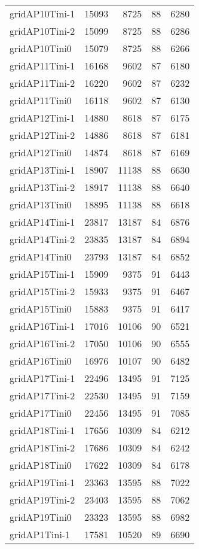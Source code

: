 \begin{longtable}{lrrrr}
gridAP10Tini-1 & 15093 & 8725 & 88 & 6280 \\
gridAP10Tini-2 & 15099 & 8725 & 88 & 6286 \\
gridAP10Tini0 & 15079 & 8725 & 88 & 6266 \\
gridAP11Tini-1 & 16168 & 9602 & 87 & 6180 \\
gridAP11Tini-2 & 16220 & 9602 & 87 & 6232 \\
gridAP11Tini0 & 16118 & 9602 & 87 & 6130 \\
gridAP12Tini-1 & 14880 & 8618 & 87 & 6175 \\
gridAP12Tini-2 & 14886 & 8618 & 87 & 6181 \\
gridAP12Tini0 & 14874 & 8618 & 87 & 6169 \\
gridAP13Tini-1 & 18907 & 11138 & 88 & 6630 \\
gridAP13Tini-2 & 18917 & 11138 & 88 & 6640 \\
gridAP13Tini0 & 18895 & 11138 & 88 & 6618 \\
gridAP14Tini-1 & 23817 & 13187 & 84 & 6876 \\
gridAP14Tini-2 & 23835 & 13187 & 84 & 6894 \\
gridAP14Tini0 & 23793 & 13187 & 84 & 6852 \\
gridAP15Tini-1 & 15909 & 9375 & 91 & 6443 \\
gridAP15Tini-2 & 15933 & 9375 & 91 & 6467 \\
gridAP15Tini0 & 15883 & 9375 & 91 & 6417 \\
gridAP16Tini-1 & 17016 & 10106 & 90 & 6521 \\
gridAP16Tini-2 & 17050 & 10106 & 90 & 6555 \\
gridAP16Tini0 & 16976 & 10107 & 90 & 6482 \\
gridAP17Tini-1 & 22496 & 13495 & 91 & 7125 \\
gridAP17Tini-2 & 22530 & 13495 & 91 & 7159 \\
gridAP17Tini0 & 22456 & 13495 & 91 & 7085 \\
gridAP18Tini-1 & 17656 & 10309 & 84 & 6212 \\
gridAP18Tini-2 & 17686 & 10309 & 84 & 6242 \\
gridAP18Tini0 & 17622 & 10309 & 84 & 6178 \\
gridAP19Tini-1 & 23363 & 13595 & 88 & 7022 \\
gridAP19Tini-2 & 23403 & 13595 & 88 & 7062 \\
gridAP19Tini0 & 23323 & 13595 & 88 & 6982 \\
gridAP1Tini-1 & 17581 & 10520 & 89 & 6690 \\

\end{longtable}
